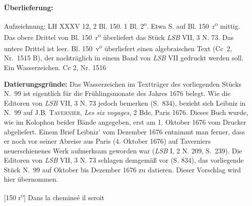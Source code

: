 \begin{ledgroupsized}[r]{120mm}%
\footnotesize%
\pstart%
\noindent\textbf{\"{U}berlieferung:}%
\pend%
\end{ledgroupsized}%
\begin{ledgroupsized}[r]{114mm}%
\footnotesize%
\pstart%
\parindent -6mm%
%
Aufzeichnung: LH XXXV 12, 2 Bl. 150.
1 Bl. 2\textsuperscript{o}. Etwa  S. auf Bl. 150~r\textsuperscript{o} mittig.
Das obere Drittel von Bl. 150~r\textsuperscript{o} überliefert das Stück \textit{LSB} VII, 3 N. 73.
Das untere Drittel ist leer.
Bl. 150~v\textsuperscript{o} überliefert einen algebraischen Text (Cc~2, Nr.~1515 B), der nachträglich in einem Band von \textit{LSB} VII gedruckt werden soll.
Ein Wasserzeichen.
\newline%
Cc 2, Nr. 1516%
\pend%
\end{ledgroupsized}%
%
\vspace*{5mm}%
\begin{ledgroup}%
\footnotesize%
\pstart%
\noindent%
\footnotesize{%
\textbf{Datierungsgr\"{u}nde:}
Das Wasserzeichen im Textträger des vorliegenden Stücks N.~99 %
ist eigentlich für die Früh\-lings\-monate des Jahres 1676 belegt.
Wie die Editoren von \cite{01129}\textit{LSB} VII, 3 N. 73 jedoch bemerken (S.~834), bezieht sich Leibniz in N.~99 %
auf \cite{01128}\textsc{J.B. Tavernier}, \textit{Les six voyages}, 2 Bde, Paris 1676.
Dieses Buch wurde, wie im Kolophon beider Bände angegeben, erst am 1. Oktober 1676 vom Drucker abgeliefert. %
Einem Brief Leibniz' vom Dezember 1676 entnimmt man ferner,
dass er noch vor seiner Abreise aus Paris (4. Oktober 1676) auf Taverniers neuerschienenes Werk aufmerksam geworden war
(\cite{01130}\textit{LSB} I, 2 N. 209, S.~239).
Die Editoren von \cite{01129}\textit{LSB} VII, 3 N. 73 schlagen demgemäß vor (S. 834), das vorliegende Stück N.~99 %
auf Oktober bis Dezember 1676 zu datieren.
Dieser Vorschlag wird hier übernommen.%
}%
\pend%
\end{ledgroup}%
%
\vspace*{8mm}%
\count{}
\count{}
\count{}
\pstart%
\normalsize%
\noindent%
[150 r\textsuperscript{o}] %
Dans la chemine\'{e}\protect{} il seroit
